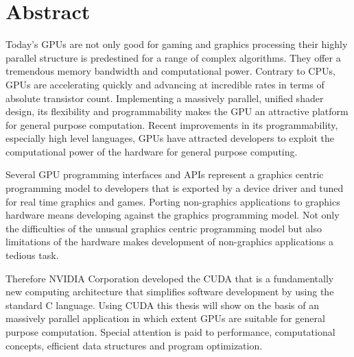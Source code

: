 \chapter*{Abstract}
Today's \glspl{GPU} are not only good for gaming and graphics processing their
highly parallel structure is predestined for a range of complex algorithms. They
offer a tremendous memory bandwidth and computational power. Contrary to
\glspl{CPU}, \glspl{GPU} are accelerating quickly and advancing at incredible
rates in terms of absolute transistor count. Implementing a massively parallel,
unified shader design, its flexibility and programmability makes the \gls{GPU}
an attractive platform for general purpose computation. Recent improvements in
its programmability, especially high level languages, \glspl{GPU} have attracted
developers to exploit the computational power of the hardware for general
purpose computing.

Several \gls{GPU} programming interfaces and \glspl{API} represent a graphics
centric programming model to developers that is exported by a device driver and
tuned for real time graphics and games. Porting non-graphics applications to
graphics hardware means developing against the graphics programming model. Not
only the difficulties of the unusual graphics centric programming model but also
limitations of the hardware makes development of non-graphics applications a
tedious task.

Therefore NVIDIA Corporation developed the \gls{CUDA} that is a fundamentally new
computing architecture that simplifies software development by using the
standard C language. Using \gls{CUDA} this thesis will show on the basis of an
massively parallel application in which extent \glspl{GPU} are suitable for
general purpose computation. Special attention is paid to performance,
computational concepts, efficient data structures and program optimization.

